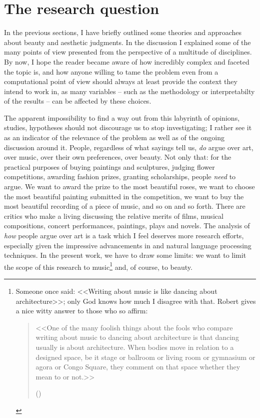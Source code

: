 \section{The research question}\label{sec:question}
In the previous sections, I have briefly outlined some theories and approaches about beauty and aesthetic judgments. In the discussion I explained some of the many points of view presented from the perspective of a multitude of disciplines. By now, I hope the reader became aware of how incredibly complex and faceted the topic is, and how anyone willing to tame the problem even from a computational point of view should always at least provide the context they intend to work in, as many variables -- such as the methodology or interpretabilty of the results -- can be affected by these choices.

The apparent impossibility to find a way out from this labyrinth of opinions, studies, hypotheses should not discourage us to stop investigating; I rather see it as an indicator of the relevance of the problem as well as of the ongoing discussion  around it. People, regardless of what sayings tell us, \emph{do} argue over art, over music, over their own preferences, over beauty. Not only that: for the practical purposes of buying paintings and sculptures, judging flower competitions, awarding fashion prizes, granting scholarships, people \emph{need} to argue. We want to award the prize to the most beautiful roses, we want to choose the most beautiful painting submitted in the competition, we want to buy the most beautiful recording of a piece of music, and so on and so forth. There are critics who make a
living discussing the relative merits of films, musical compositions, concert
performances, paintings, plays and novels. The analysis of \emph{how} people argue over art is a task which I feel deserves more research efforts, especially given the impressive advancements in  and natural language processing techniques. In the present work, we have to draw some limits: we want to limit the scope of this research to music\footnote{Someone once said: <<Writing about music is like dancing about architecture>>; only God knows how much I disagree with that. Robert \citeauthor{christgau2005writing} gives a nice witty answer to those who so affirm: 
\begin{quote}
<<One of the many foolish things about the fools who compare writing about music to dancing about architecture is that dancing usually is about architecture. When bodies move in relation to a designed space, be it stage or ballroom or living room or gymnasium or agora or Congo Square, they comment on that space whether they mean to or not.>>

(\cite{christgau2005writing})
\end{quote}} and, of course, to beauty.

